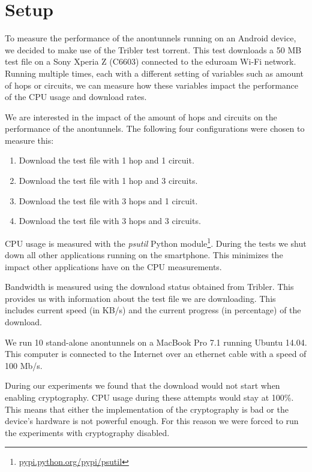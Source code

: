 % 
\section{Setup}
	\label{sec:experiments:approach}
	To measure the performance of the anontunnels running on an Android device, we decided to make use of the Tribler test torrent. This test downloads a 50 MB test file on a Sony Xperia Z (C6603)  connected to the eduroam Wi-Fi network. Running multiple times, each with a different setting of variables such as amount of hops or circuits, we can measure how these variables impact the performance of the CPU usage and download rates.
	
	We are interested in the impact of the amount of hops and circuits on the performance of the anontunnels. The following four configurations were chosen to measure this:
	
	\begin{enumerate}
		\item Download the test file with 1 hop and 1 circuit.
		\item Download the test file with 1 hop and 3 circuits.
		\item Download the test file with 3 hops and 1 circuit.
		\item Download the test file with 3 hops and 3 circuits.
	\end{enumerate}
	
	CPU usage is measured with the \emph{psutil} Python module\footnote{\href{https://pypi.python.org/pypi/psutil}{pypi.python.org/pypi/psutil}}. During the tests we shut down all other applications running on the smartphone. This minimizes the impact other applications have on the CPU measurements.
	
	Bandwidth is measured using the download status obtained from Tribler. This provides us with information about the test file we are downloading. This includes current speed (in KB/s) and the current progress (in percentage) of the download.
	
	We run 10 stand-alone anontunnels on a MacBook Pro 7.1 running Ubuntu 14.04. This computer is connected to the Internet over an ethernet cable with a speed of 100 Mb/s. 
	
	During our experiments we found that the download would not start when enabling cryptography. CPU usage during these attempts would stay at 100\%. This means that either the implementation of the cryptography is bad or the device's hardware is not powerful enough. For this reason we were forced to run the experiments with cryptography disabled.
	
